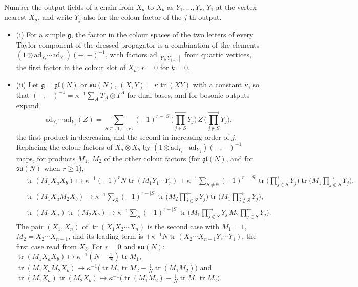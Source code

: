 \begin{lemma}
\label{lem:c10-colour}
Number the output fields of a chain from $X_a$ to $X_b$ as $Y_1,\dots,Y_r$, $Y_1$ at the vertex nearest $X_a$, and write $Y_j$ also for the colour factor of the $j$-th output.
\begin{itemize}
\item (i) For a simple $\mathfrak g$, the factor in the colour spaces of the two letters of every Taylor component of the dressed propagator is a combination of the elements $(1\otimes\mathrm{ad}_{Y_r}\cdots\mathrm{ad}_{Y_1})(-,-)^{-1}$, with factors $\mathrm{ad}_{[Y_j,Y_{j+1}]}$ from quartic vertices, the first factor in the colour slot of $X_a$; $r=0$ for $k=0$.
\item (ii) Let $\mathfrak g=\mathfrak{gl}(N)$ or $\mathfrak{su}(N)$, $(X,Y)=\kappa\operatorname{tr}(XY)$ with a constant $\kappa$, so that $(-,-)^{-1}=\kappa^{-1}\sum_AT_A\otimes T^A$ for dual bases, and for bosonic outputs expand
\[
\mathrm{ad}_{Y_r}\cdots\mathrm{ad}_{Y_1}(Z)=\sum_{S\subseteq\{1,\dots,r\}}(-1)^{r-|S|}\Big(\prod_{j\in S}^{\leftarrow}Y_j\Big)\,Z\,\Big(\prod_{j\notin S}^{\rightarrow}Y_j\Big),
\]
the first product in decreasing and the second in increasing order of $j$. Replacing the colour factors of $X_a\otimes X_b$ by $(1\otimes\mathrm{ad}_{Y_r}\cdots\mathrm{ad}_{Y_1})(-,-)^{-1}$ maps, for products $M_1$, $M_2$ of the other colour factors (for $\mathfrak{gl}(N)$, and for $\mathfrak{su}(N)$ when $r\ge1$),
\[
\begin{aligned}
&\operatorname{tr}(M_1X_aX_b)\mapsto\kappa^{-1}(-1)^rN\operatorname{tr}(M_1Y_1\cdots Y_r)+\kappa^{-1}\sum_{S\ne\emptyset}(-1)^{r-|S|}\operatorname{tr}\Big(\prod_{j\in S}^{\leftarrow}Y_j\Big)\operatorname{tr}\Big(M_1\prod_{j\notin S}^{\rightarrow}Y_j\Big),\\
&\operatorname{tr}(M_1X_aM_2X_b)\mapsto\kappa^{-1}\sum_S(-1)^{r-|S|}\operatorname{tr}\Big(M_2\prod_{j\in S}^{\leftarrow}Y_j\Big)\operatorname{tr}\Big(M_1\prod_{j\notin S}^{\rightarrow}Y_j\Big),\\
&\operatorname{tr}(M_1X_a)\operatorname{tr}(M_2X_b)\mapsto\kappa^{-1}\sum_S(-1)^{r-|S|}\operatorname{tr}\Big(M_1\prod_{j\notin S}^{\rightarrow}Y_j\,M_2\prod_{j\in S}^{\leftarrow}Y_j\Big).
\end{aligned}
\]
The pair $(X_1,X_n)$ of $\operatorname{tr}(X_1X_2\cdots X_n)$ is the second case with $M_1=1$, $M_2=X_2\cdots X_{n-1}$, and its leading term is $+\kappa^{-1}N\operatorname{tr}(X_2\cdots X_{n-1}Y_r\cdots Y_1)$, the first case read from $X_b$. For $r=0$ and $\mathfrak{su}(N)$: $\operatorname{tr}(M_1X_aX_b)\mapsto\kappa^{-1}(N-\tfrac1N)\operatorname{tr}M_1$, $\operatorname{tr}(M_1X_aM_2X_b)\mapsto\kappa^{-1}\big(\operatorname{tr}M_1\operatorname{tr}M_2-\tfrac1N\operatorname{tr}(M_1M_2)\big)$ and $\operatorname{tr}(M_1X_a)\operatorname{tr}(M_2X_b)\mapsto\kappa^{-1}\big(\operatorname{tr}(M_1M_2)-\tfrac1N\operatorname{tr}M_1\operatorname{tr}M_2\big)$.

\end{itemize}
\end{lemma}
